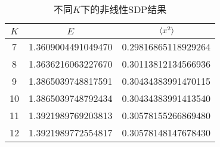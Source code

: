 
\begin{table}
    \caption{不同$K$下的非线性SDP结果}
    \label{tbl:nonlinear-different-k}
    \centering
    \begin{tabular}{ccc}
        \toprule
          $K$ & $E$ & $\expval*{x^2}$ \\
        \midrule
           7 & 1.3609004491049470  & 0.29816865118929264  \\
           8 & 1.3636216063227670  & 0.30113812134566936  \\
           9 & 1.3865039748817591  & 0.30434383991470115  \\
          10 & 1.3865039748792434  & 0.30434383991413540  \\ 
          11 & 1.3921989769203813  & 0.30578155266869480  \\
          12 & 1.3921989772554817  & 0.30578148147678430  \\
        \bottomrule
    \end{tabular}
\end{table}